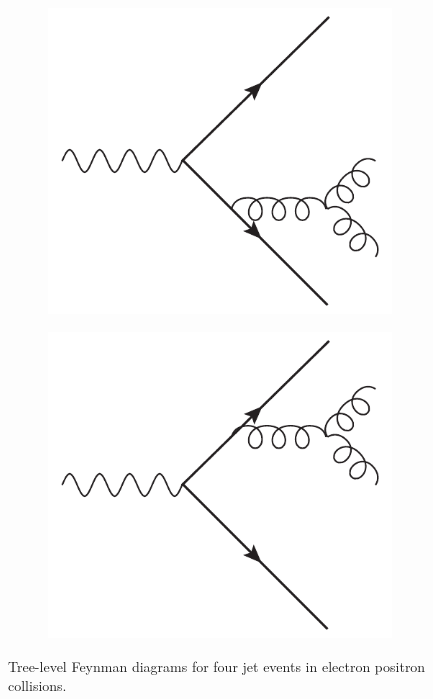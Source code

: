 \begin{figure}
\begin{center}
    \begin{subfigure}{0.244\textwidth}
      \includegraphics[width=\textwidth]{Chapters/pQCD/gluon7.pdf}\caption{}\end{subfigure}
    \begin{subfigure}{0.244\textwidth}
      \includegraphics[width=\textwidth]{Chapters/pQCD/gluon8.pdf}\caption{}\end{subfigure}
    \caption{Tree-level Feynman diagrams for four jet events in electron
      positron collisions.}
    \label{fig:gluons}
\end{center}
\end{figure}


